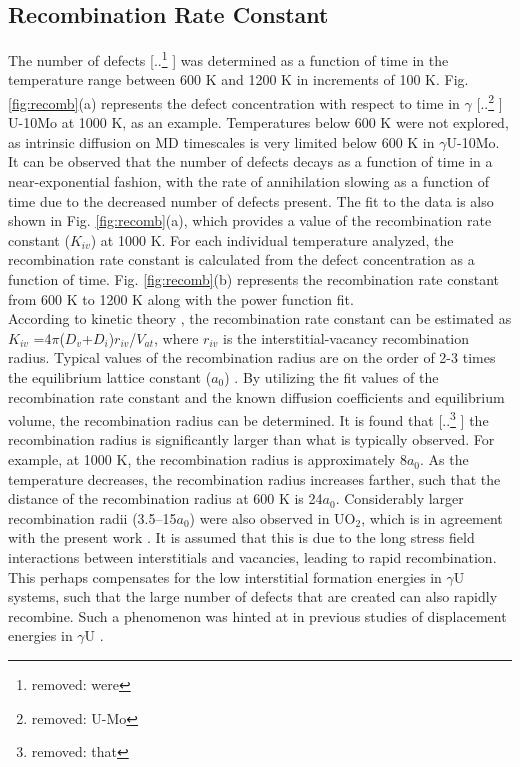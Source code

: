 \documentclass[preprint,12pt]{elsarticle}
\providecommand{\DIFadd}[1]{{\protect\color{blue} \sf #1}} %
\providecommand{\DIFdel}[1]{{\protect\color{red} [..\footnote{removed: #1} ]}} %
\providecommand{\DIFaddbegin}{} %
\providecommand{\DIFaddend}{} %
\providecommand{\DIFdelbegin}{} %
\providecommand{\DIFdelend}{} %
\newcommand{\DIFscaledelfig}{0.5}
\newlength{\DIFdelgraphicswidth} %
\newlength{\DIFdelgraphicsheight} %
\newcommand{\DIFaddincludegraphics}[2][]{{\color{blue}\fbox{\DIFOincludegraphics[#1]{#2}}}} %
\newcommand{\DIFdelincludegraphics}[2][]{%
\sbox{\DIFdelgraphicsbox}{\DIFOincludegraphics[#1]{#2}}%
\settoboxwidth{\DIFdelgraphicswidth}{\DIFdelgraphicsbox} %
\settoboxtotalheight{\DIFdelgraphicsheight}{\DIFdelgraphicsbox} %
\scalebox{\DIFscaledelfig}{%
\parbox[b]{\DIFdelgraphicswidth}{\usebox{\DIFdelgraphicsbox}\\[-\baselineskip] \rule{\DIFdelgraphicswidth}{0em}}\llap{\resizebox{\DIFdelgraphicswidth}{\DIFdelgraphicsheight}{%
\setlength{\unitlength}{\DIFdelgraphicswidth}%
\begin{picture}(1,1)%
\thicklines\linethickness{2pt} %
{\color[rgb]{1,0,0}\put(0,0){\framebox(1,1){}}}%
{\color[rgb]{1,0,0}\put(0,0){\line( 1,1){1}}}%
{\color[rgb]{1,0,0}\put(0,1){\line(1,-1){1}}}%
\end{picture}%
}\hspace*{3pt}}} %
} %
\DeclareRobustCommand{\DIFaddbegin}{\DIFOaddbegin \let\includegraphics\DIFaddincludegraphics} %
\DeclareRobustCommand{\DIFaddend}{\DIFOaddend \let\includegraphics\DIFOincludegraphics} %
\DeclareRobustCommand{\DIFdelbegin}{\DIFOdelbegin \let\includegraphics\DIFdelincludegraphics} %
\DeclareRobustCommand{\DIFdelend}{\DIFOaddend \let\includegraphics\DIFOincludegraphics} %
\begin{document}
\subsection{Recombination Rate Constant}\label{sec:recomb}
The number of defects \DIFdelbegin \DIFdel{were }\DIFdelend \DIFaddbegin \DIFadd{was }\DIFaddend determined as a function \DIFaddbegin \DIFadd{of }\DIFaddend time in the temperature range between 600 K and 1200 K in increments of 100 K. Fig. \ref{fig:recomb}(a) represents the defect concentration with respect to time in $\gamma$\DIFdelbegin \DIFdel{U-Mo }\DIFdelend \DIFaddbegin \DIFadd{U-10Mo }\DIFaddend at 1000 K, as an example. Temperatures below 600 K were not explored, as intrinsic diffusion on MD timescales is very limited below 600 K in $\gamma$U-10Mo.  It can be observed that the number of defects decays as a function of time in a near-exponential fashion, with the rate of annihilation slowing as a function of time due to the decreased number of defects present. The fit to the data is also shown in Fig. \ref{fig:recomb}(a), which provides a value of the recombination rate constant ($K_{iv}$) at 1000 K. For each individual temperature analyzed, the recombination rate constant is calculated from the defect concentration as a function of time. Fig. \ref{fig:recomb}(b) represents the recombination rate constant from 600 K to 1200 K along with the power function fit.\\
\indent According to kinetic theory \cite{was2016fundamentals}, the recombination rate constant can be estimated as $K_{iv}$ =4$\pi$($D_{v}$+$D_{i}$)$r_{iv}$/$V_{at}$, where $r_{iv}$ is the interstitial-vacancy recombination radius. Typical values of the recombination radius are on the order of 2-3 times the equilibrium lattice constant ($a_{0}$) \cite{yu2012radiation, nakashima2015recombination}. By utilizing the fit values of the recombination rate constant and the known diffusion coefficients and equilibrium volume, the recombination radius can be determined. It is found that \DIFdelbegin \DIFdel{that }\DIFdelend \DIFaddbegin \DIFadd{the }\DIFaddend recombination radius is significantly larger than what is typically observed. For example, at 1000 K, the recombination radius is approximately 8$a_{0}$. As the temperature decreases, the recombination radius increases farther, such that the distance of the recombination radius at 600 K is 24$a_{0}$. \DIFaddbegin \DIFadd{Considerably larger recombination radii (3.5–15$a_{0}$) were also observed in UO$_{2}$, which is in agreement with the present work \cite{veshchunov2015development}. }\DIFaddend It is assumed that this is due to the long stress field interactions between interstitials and vacancies, leading to rapid recombination. This perhaps compensates for the low interstitial formation energies in $\gamma$U systems, such that the large number of defects that are created can also rapidly recombine. Such a phenomenon was hinted at in previous studies of displacement energies in $\gamma$U \cite{beeler2018calculation}.
\end{document}
